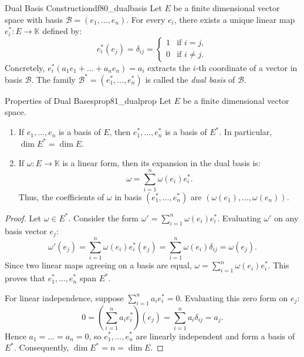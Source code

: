 \documentclass[11pt, a4paper]{article}
\newcommand{\K}{\mathbb{K}}
\begin{document}
\begin{definition}{Dual Basis Construction}{df80_dualbasis}
  Let $E$ be a finite dimensional vector space with basis $\mathcal{B} = (e_1, \dots, e_n)$. For every $e_i$, there exists a unique linear map $e_i^*: E \to \K$ defined by:
  \[
    e_i^*(e_j) = \delta_{ij} = \begin{cases} 1 & \text{if } i = j, \\ 0 & \text{if } i \neq j. \end{cases}
  \]
  Concretely, $e_i^*(a_1 e_1 + \dots + a_n e_n) = a_i$ extracts the $i$-th coordinate of a vector in basis $\mathcal{B}$. The family $\mathcal{B}^* = (e_1^*, \dots, e_n^*)$ is called the \emph{dual basis} of $\mathcal{B}$.
\end{definition}

\begin{proposition}{Properties of Dual Bases}{prop81_dualprop}
  Let $E$ be a finite dimensional vector space.
  \begin{enumerate}
    \item If $e_1, \dots, e_n$ is a basis of $E$, then $e_1^*, \dots, e_n^*$ is a basis of $E^*$. In particular, $\dim E^* = \dim E$.
    \item If $\omega: E \to \K$ is a linear form, then its expansion in the dual basis is:
    \[
      \omega = \sum_{i=1}^n \omega(e_i) e_i^*.
    \]
    Thus, the coefficients of $\omega$ in basis $(e_1^*, \dots, e_n^*)$ are $(\omega(e_1), \dots, \omega(e_n))$.
  \end{enumerate}
\end{proposition}

\begin{proof}
  Let $\omega \in E^*$. Consider the form $\omega' = \sum_{i=1}^n \omega(e_i) e_i^*$. Evaluating $\omega'$ on any basis vector $e_j$:
  \[
    \omega'(e_j) = \sum_{i=1}^n \omega(e_i) e_i^*(e_j) = \sum_{i=1}^n \omega(e_i) \delta_{ij} = \omega(e_j).
  \]
  Since two linear maps agreeing on a basis are equal, $\omega = \sum_{i=1}^n \omega(e_i) e_i^*$. This proves that $e_1^*, \dots, e_n^*$ span $E^*$.

  For linear independence, suppose $\sum_{i=1}^n a_i e_i^* = 0$. Evaluating this zero form on $e_j$:
  \[
    0 = \left(\sum_{i=1}^n a_i e_i^*\right)(e_j) = \sum_{i=1}^n a_i \delta_{ij} = a_j.
  \]
  Hence $a_1 = \dots = a_n = 0$, so $e_1^*, \dots, e_n^*$ are linearly independent and form a basis of $E^*$. Consequently, $\dim E^* = n = \dim E$.
\end{proof}
\end{document}
